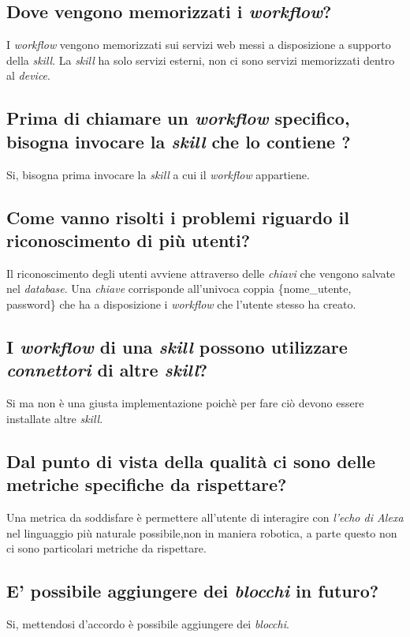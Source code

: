 \documentclass[a4paper,12pt]{article}
\begin{document}
	\subsection{Dove vengono memorizzati i \textit{workflow}?}
	I \textit{workflow} vengono memorizzati sui servizi web messi a disposizione a supporto della \textit{skill}. La \textit{skill} ha solo servizi esterni, non ci sono servizi memorizzati dentro al \textit{device}. 
	\subsection{Prima di chiamare un \textit{workflow} specifico, bisogna invocare la \textit{skill} che lo contiene ?}
	Si, bisogna prima invocare la \textit{skill} a cui il \textit{workflow} appartiene.
	\subsection{Come vanno risolti i problemi riguardo il riconoscimento di più utenti?}
	Il riconoscimento degli utenti avviene attraverso delle \textit{chiavi} che vengono salvate nel \textit{database}. Una \textit{chiave} corrisponde all'univoca coppia \{nome\_utente, password\} che ha a disposizione i \textit{workflow} che l'utente stesso  ha creato.
	\subsection{I \textit{workflow} di una \textit{skill} possono utilizzare \textit{connettori}  di altre \textit{skill}?}
	Si ma non è una giusta implementazione poichè per fare ciò devono essere installate altre \textit{skill}.
    \subsection{Dal punto di vista della qualità ci sono delle metriche specifiche da rispettare?}
    Una metrica da soddisfare è permettere all'utente di interagire con \textit{l'echo di Alexa} nel linguaggio più naturale possibile,non in maniera robotica, a parte questo non ci sono particolari metriche da rispettare.
    \subsection{E' possibile aggiungere dei \textit{blocchi} in futuro?}
    Si, mettendosi d'accordo è possibile aggiungere dei \textit{blocchi}.	
		\label{LastPage}
\end{document}
